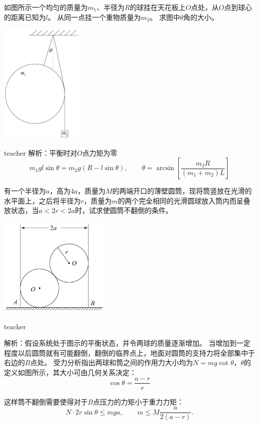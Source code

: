 \begin{example}
如图所示一个均匀的质量为$m_1$、半径为$R$的球挂在天花板上$O$点处，从$O$点到球心的距离已知为$l$。
从同一点挂一个重物质量为$m_2$。
求图中$\theta$角的大小。
\begin{flushright}
\includegraphics[width = 0.3\textwidth]{images/static-force-15.pdf} 
\end{flushright}
\begin{taggedblock}{teacher}
\noindent
解析：平衡时对$O$点力矩为零
\[
m_1gl\sin\theta = m_2g(R-l\sin\theta),\qquad \theta = \arcsin\left[\frac{m_2R}{(m_1+m_2)L}\right]
\]
\end{taggedblock}
\end{example}




\begin{example}

有一个半径为$a$，高为$4a$，质量为$M$的两端开口的薄壁圆筒，现将筒竖放在光滑的水平面上，之后将半径为$r$，质量为$m$的两个完全相同的光滑圆球放入筒内而呈叠放状态，当$a< 2r < 2a$时，试求使圆筒不翻倒的条件。
\begin{flushright}
\includegraphics[width = 0.4\textwidth]{images/static-force-17.pdf} 
\end{flushright}
\begin{taggedblock}{teacher}

\vspace*{4cm}
\noindent
解析：假设系统处于图示的平衡状态，并令两球的质量逐渐增加。
当增加到一定程度以后圆筒就有可能翻倒，翻倒的临界点上，地面对圆筒的支持力将全部集中于右边的$B$点处。
受力分析指出两球和筒之间的作用力大小均为$N = mg\cot\theta$，$\theta$的定义如图所示，其大小可由几何关系决定：
\[
\cos\theta = \frac{a-r}{r}
\]

这样筒不翻倒需要使得对于$B$点压力的力矩小于重力力矩：
\[
N\cdot 2r\sin\theta \le mga,\qquad m\le M\frac{a}{2(a-r)}.
\]
\end{taggedblock}
\end{example}


